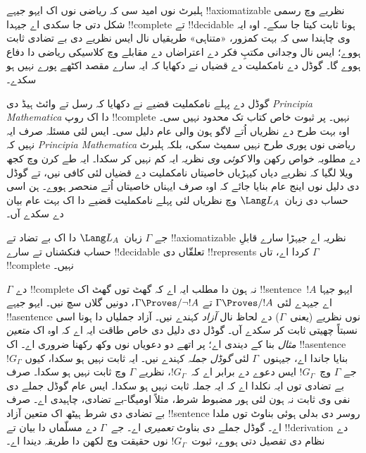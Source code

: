 \documentclass[../../../include/open-logic-section]{subfiles}
\begin{document}


ہلبرٹ نوں امید سی کہ ریاضی نوں اک ایہو جیہے !!{axiomatizable}
نظریے وچ رسمی شکل دتی جا سکدی اے جیہدا
!!{complete} تے !!{decidable} ہونا ثابت
کیتا جا سکے۔ اوہ ایہ وی چاہندا سی
کہ بہت کمزور، «متناہی» طریقیاں نال ایس نظریے
دی بے تضادی ثابت ہووے؛ ایس نال وجدانی مکتبِ
فکر دے اعتراضاں دے مقابلے وچ کلاسیکی ریاضی
دا دفاع ہووے گا۔ گوڈل دے نامکملیت دے قضیاں
نے دکھایا کہ ایہ سارے مقصد اکٹھے پورے نہیں
ہو سکدے۔

گوڈل دے پہلے نامکملیت قضیے نے دکھایا کہ
رسل تے وائٹ ہیڈ دی \emph{Principia Mathematica}
دا اک روپ !!{complete} نہیں۔ پر ثبوت خاص
کتاب تک محدود نہیں سی۔ اوہ بہت طرح دے
نظریاں اُتے لاگو ہون والی عام دلیل سی۔
ایس لئی مسئلہ صرف ایہ نہیں کہ
\emph{Principia Mathematica} ریاضی نوں پوری
طرح نہیں سمیٹ سکی، بلکہ ہلبرٹ دے مطلوبہ
خواص رکھن والا \emph{کوئی وی} نظریہ ایہ
کم نہیں کر سکدا۔ ایہ طے کرن وچ کجھ ویلا
لگیا کہ نظریے دیاں کیہڑیاں خاصیتاں نامکملیت
دے قضیاں لئی کافی نیں، تے گوڈل دی دلیل
نوں اینج عام بنایا جائے کہ اوہ صرف ایہناں
خاصیتاں اُتے منحصر ہووے۔ ہن اسی حساب دی
زبان~$\Lang L_A$ وچ نظریاں لئی پہلے
نامکملیت قضیے دا اک بہت عام بیان دے
سکدے آں۔

\begin{thm}
جے $\Gamma$ زبان~$\Lang L_A$ دا اک بے تضاد
تے !!{axiomatizable} نظریہ اے جیہڑا سارے
قابلِ حساب فنکشناں تے سارے !!{decidable}
تعلقّاں دی !!{represents} کردا اے، تاں
$\Gamma$ !!{complete} نہیں۔
\end{thm}

$\Gamma$ دے !!{complete} نہ ہون دا مطلب
ایہ اے کہ گھٹ توں گھٹ اک !!{sentence}~$!A$
ایہو جیہا اے جیہدے لئی $\Gamma \Proves/ !A$ تے
$\Gamma \Proves/ \lnot !A$، دونیں گلاں سچ نیں۔
ایہو جیہے !!a{sentence} نوں نظریے
(یعنی~$\Gamma$) دے لحاظ نال \emph{آزاد}
کہندے نیں۔ آزاد جملیاں دا ہونا اسی نسبتاً
چھیتی ثابت کر سکدے آں۔ گوڈل دی دلیل دی
خاص طاقت ایہ اے کہ اوہ اک \emph{متعین مثال}
بنا کے دیندی اے؛ پر اتھے دو دعویاں نوں
وکھ رکھنا ضروری اے۔ اک !!a{sentence}~$!G_\Gamma$
بنایا جاندا اے، جیہنوں~$\Gamma$ لئی
\emph{گوڈل جملہ} کہندے نیں۔ ایہ
ثابت نہیں ہو سکدا، کیوں جے
$\Gamma$ وچ~$!G_\Gamma$ ایس دعوے دے
برابر اے کہ~$!G_\Gamma$، نظریے
$\Gamma$ وچ ثابت نہیں ہو سکدا۔
صرف بے تضادی توں ایہ نکلدا اے کہ
ایہ جملہ ثابت نہیں ہو سکدا۔
ایس عام گوڈل جملے دی نفی وی ثابت نہ ہون
لئی ہور مضبوط شرط، مثلاً اومیگا-بے تضادی،
چاہیدی اے۔ صرف بے تضادی دی شرط ہیٹھ
اک متعین آزاد !!{sentence} روسر دی بدلی ہوئی
بناوٹ توں ملدا اے۔ گوڈل جملے دی بناوٹ
\emph{تعمیری} اے۔ جے~$\Gamma$ دے مسلّماں
دا بیان تے !!{derivation} دے نظام دی تفصیل
دتی ہووے، ثبوت~$!G_\Gamma$ نوں حقیقت وچ
لکھن دا طریقہ دیندا اے۔
\end{document}
